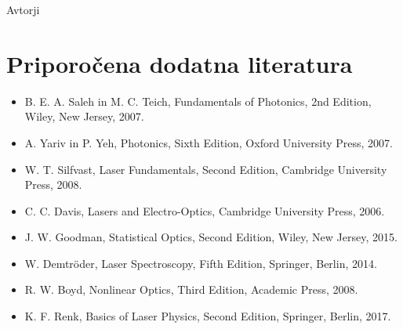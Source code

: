 \documentclass[11pt,fleqn]{book} %
\begin{document}
% 
\vspace{1em}

 Avtorji





\chapter*{Priporočena dodatna literatura}

\begin{itemize}
\setlength\itemsep{0.5em}
 \item B. E. A. Saleh in M. C. Teich, Fundamentals of Photonics, 2nd Edition, Wiley, New Jersey, 2007. 
 \item A. Yariv in P. Yeh, Photonics, Sixth Edition, Oxford University Press, 2007.
 \item W. T. Silfvast, Laser Fundamentals, Second Edition, Cambridge University Press, 2008. 
 \item C. C. Davis, Lasers and Electro-Optics, Cambridge University Press, 2006.
 \item J. W. Goodman, Statistical Optics, Second Edition, Wiley, New Jersey, 2015.
 \item W. Demtr\"oder, Laser Spectroscopy, Fifth Edition, Springer, Berlin, 2014.
 \item R. W. Boyd, Nonlinear Optics, Third Edition, Academic Press, 2008.
 \item K. F. Renk, Basics of Laser Physics, Second Edition, Springer, Berlin, 2017.
\end{itemize}
\end{document}

